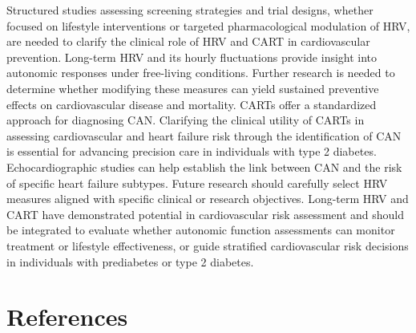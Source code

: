 \documentclass[
  a4paper,
  headsepline=true,
  open=any]{scrbook}
\begin{document}
Structured studies assessing screening strategies and trial designs,
whether focused on lifestyle interventions or targeted pharmacological
modulation of HRV, are needed to clarify the clinical role of HRV and
CART in cardiovascular prevention. Long-term HRV and its hourly
fluctuations provide insight into autonomic responses under free-living
conditions. Further research is needed to determine whether modifying
these measures can yield sustained preventive effects on cardiovascular
disease and mortality. CARTs offer a standardized approach for
diagnosing CAN. Clarifying the clinical utility of CARTs in assessing
cardiovascular and heart failure risk through the identification of CAN
is essential for advancing precision care in individuals with type 2
diabetes. Echocardiographic studies can help establish the link between
CAN and the risk of specific heart failure subtypes. Future research
should carefully select HRV measures aligned with specific clinical or
research objectives. Long-term HRV and CART have demonstrated potential
in cardiovascular risk assessment and should be integrated to evaluate
whether autonomic function assessments can monitor treatment or
lifestyle effectiveness, or guide stratified cardiovascular risk
decisions in individuals with prediabetes or type 2 diabetes.


\hypertarget{references}{%
\chapter*{References}\label{references}}

\end{document}
